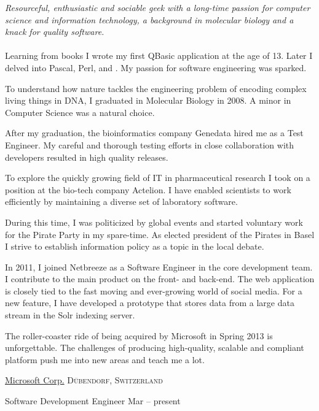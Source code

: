 \documentclass[10pt,a4paper]{article}
\begin{document}
\vspace{-1.3em}  
\begin{multicols}{2}  %
\noindent \emph{Resourceful, enthusiastic and sociable geek with a long-time passion for computer science and information technology, a background in molecular biology and a knack for quality software.}
\\
\\
Learning from books I wrote my first QBasic application at the age of 13. Later I delved into Pascal, Perl,  and . My passion for software engineering was sparked.

To understand how nature tackles the engineering problem of encoding complex living things in DNA, I graduated in Molecular Biology in 2008. A minor in Computer Science was a natural choice.

After my graduation, the bioinformatics company Genedata hired me as a Test Engineer. My careful and thorough testing efforts in close collaboration with developers resulted in high quality releases.

To explore the quickly growing field of IT in pharmaceutical research I took on a position at the bio-tech company Actelion. I have enabled scientists to work efficiently by maintaining a diverse set of laboratory software. 

During this time, I was politicized by global events and started voluntary work for the Pirate Party in my spare-time. As elected president of the Pirates in Basel I strive to establish information policy as a topic in the local debate.

In 2011, I joined Netbreeze as a Software Engineer in the core development team. I contribute to the main product on the front- and back-end. The web application is closely tied to the fast moving and ever-growing world of social media. For a new feature, I have developed a prototype that stores data from a large data stream in the Solr indexing server.

The roller-coaster ride of being acquired by Microsoft in Spring 2013 is unforgettable. The challenges of producing high-quality, scalable and compliant platform push me into new areas and teach me a lot. 
\end{multicols}


\spacedhrule{0em}{-0.4em}


\headedsection 
  {\href{http://microsoft.com/}{Microsoft Corp.}}
  {\textsc{D\"ubendorf, Switzerland}} {%

  \headedsubsection 
    {Software Development Engineer}
    {Mar  -- present}
    {}
}
\end{document}
